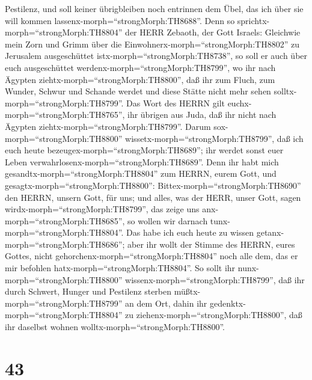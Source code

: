 Pestilenz, und soll keiner übrigbleiben noch entrinnen dem Übel, das ich
über sie will kommen lassenx-morph=``strongMorph:TH8688''. 
Denn so sprichtx-morph=``strongMorph:TH8804'' der HERR Zebaoth, der Gott
Israels: Gleichwie mein Zorn und Grimm über die
Einwohnerx-morph=``strongMorph:TH8802'' zu Jerusalem ausgeschüttet
istx-morph=``strongMorph:TH8738'', so soll er auch über euch
ausgeschüttet werdenx-morph=``strongMorph:TH8799'', wo ihr nach Ägypten
ziehtx-morph=``strongMorph:TH8800'', daß ihr zum Fluch, zum Wunder,
Schwur und Schande werdet und diese Stätte nicht mehr sehen
solltx-morph=``strongMorph:TH8799''.  Das Wort des HERRN
gilt euchx-morph=``strongMorph:TH8765'', ihr übrigen aus Juda, daß ihr
nicht nach Ägypten ziehtx-morph=``strongMorph:TH8799''. Darum
sox-morph=``strongMorph:TH8800'' wissetx-morph=``strongMorph:TH8799'',
daß ich euch heute bezeugex-morph=``strongMorph:TH8689''; 
ihr werdet sonst euer Leben verwahrlosenx-morph=``strongMorph:TH8689''.
Denn ihr habt mich gesandtx-morph=``strongMorph:TH8804'' zum HERRN,
eurem Gott, und gesagtx-morph=``strongMorph:TH8800'':
Bittex-morph=``strongMorph:TH8690'' den HERRN, unsern Gott, für uns; und
alles, was der HERR, unser Gott, sagen
wirdx-morph=``strongMorph:TH8799'', das zeige uns
anx-morph=``strongMorph:TH8685'', so wollen wir darnach
tunx-morph=``strongMorph:TH8804''.  Das habe ich euch heute
zu wissen getanx-morph=``strongMorph:TH8686''; aber ihr wollt der Stimme
des HERRN, eures Gottes, nicht gehorchenx-morph=``strongMorph:TH8804''
noch alle dem, das er mir befohlen hatx-morph=``strongMorph:TH8804''.
 So sollt ihr nunx-morph=``strongMorph:TH8800''
wissenx-morph=``strongMorph:TH8799'', daß ihr durch Schwert, Hunger und
Pestilenz sterben müßtx-morph=``strongMorph:TH8799'' an dem Ort, dahin
ihr gedenktx-morph=``strongMorph:TH8804'' zu
ziehenx-morph=``strongMorph:TH8800'', daß ihr daselbst wohnen
wolltx-morph=``strongMorph:TH8800''.

\hypertarget{section-42}{%
\section{43}\label{section-42}}

